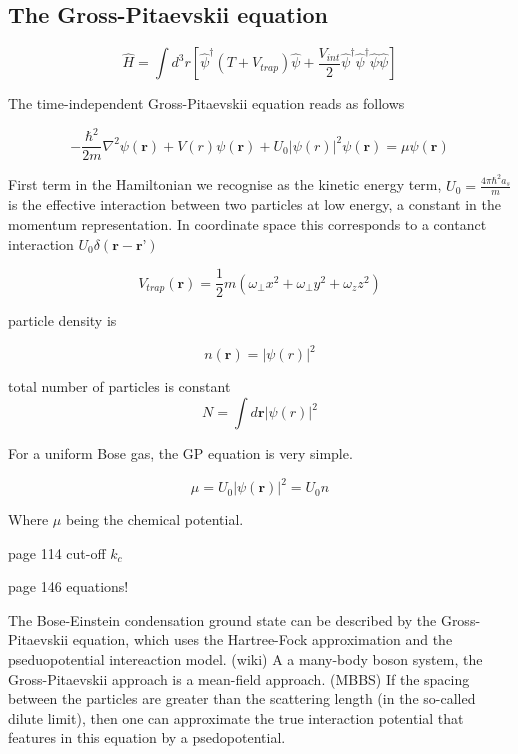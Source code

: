 \subsection{The Gross-Pitaevskii equation}

\begin{equation}
\hat{H} = \int d^3 r \left[ \hat{\psi}^{\dagger}(T + V_{trap})\hat{\psi} + \frac{V_{int}}{2} \hat{\psi}^{\dagger} \hat{\psi}^{\dagger} \hat{\psi} \hat{\psi} \right]
\end{equation}



The time-independent Gross-Pitaevskii equation reads as follows

\begin{equation} \label{eq:Gross-Pitaevskii}
-\frac{\hbar^2}{2m} \nabla^2 \psi (\textbf{r})  + V(r) \psi (\textbf{r}) + U_0|\psi(r)|^2 \psi (\textbf{r}) = \mu \psi (\textbf{r})
\end{equation}

First term in the Hamiltonian we recognise as the kinetic energy term, $U_0 = \frac{4 \pi \hbar^2 a_s}{m}$ is the effective interaction between two particles at low energy, a constant in the momentum representation. In coordinate space this corresponds to a contanct interaction $U_0 \delta(\textbf{r} - \textbf{r'})$

\begin{equation}
V_{trap}(\textbf{r}) = \frac{1}{2} m (\omega_{\perp} x^2 + \omega_{\perp} y^2 + \omega_{z} z^2)
\end{equation}

particle density is

\begin{equation}
n(\textbf{r}) = |\psi(r)|^2
\end{equation}

total number of particles is constant
\begin{equation}
N = \int d\textbf{r}|\psi(r)|^2
\end{equation}


For a uniform Bose gas, the GP equation is very simple.

\begin{equation}
\mu = U_0 |\psi (\textbf{r})|^2 = U_0n
\end{equation}

Where $\mu$ being the chemical potential.

page 114
cut-off $k_c$

page 146 equations!

The Bose-Einstein condensation ground state can be described by the Gross-Pitaevskii equation, which uses the Hartree-Fock approximation and the pseduopotential intereaction model. (wiki) 
A a many-body boson system, the Gross-Pitaevskii approach is a mean-field approach. (MBBS)
If the spacing between the particles are greater than the scattering length (in the so-called dilute limit), then one can approximate the true interaction potential that features in this equation by a psedopotential.

